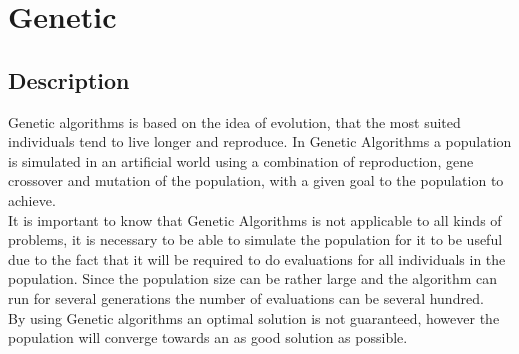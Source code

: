 \section{Genetic}
\subsection{Description}
Genetic algorithms is based on the idea of evolution, that the most suited individuals tend to live longer and reproduce. In Genetic Algorithms a population is simulated in an artificial world using a combination of reproduction, gene crossover and mutation of the population, with a given goal to the population to achieve.\cite{GAHandbook1}\\
It is important to know that Genetic Algorithms is not applicable to all kinds of problems, it is necessary to be able to simulate the population for it to be useful due to the fact that it will be required to do evaluations for all individuals in the population. Since the population size can be rather large and the algorithm can run for several generations the number of evaluations can be several hundred.\\
By using Genetic algorithms an optimal solution is not guaranteed, however the population will converge towards an as good solution as possible. 

